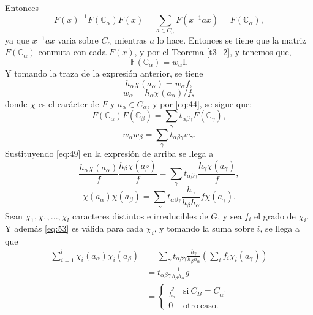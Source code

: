 \documentclass[12pt]{book}
\theoremstyle{definition}
\newcounter{in}
\begin{document}
Entonces
\begin{equation}
  \label{eq:47}
  F(x)^{-1}F(\mathbb{C}_{\alpha})F(x)=\sum_{a \in C_{\alpha}}F(x^{-1}ax)=F(\mathbb{C}_{\alpha}),
\end{equation}
ya que $x^{-1}ax$ varia sobre $C_{\alpha}$ mientras $a$ lo
hace. Entonces se tiene que la matriz $F (\mathbb{C}_{\alpha})$ conmuta con cada $F(x)$, y
por el Teorema \ref{t3_2}, y tenemos que,
\begin{equation}
  \label{eq:48}
   \mathbb{F} (\mathbb{C}_{\alpha})=w_{\alpha}\mathrm{I}.
\end{equation}
Y tomando la traza de la expresión anterior, se tiene
\begin{equation}
  \label{eq:49}
  h_{\alpha}\chi(a_{\alpha})=w_{\alpha}f,
\end{equation}
\begin{equation}
  \label{eq:50}
  w_{\alpha}=h_{\alpha}\chi(a_{\alpha})/f,
\end{equation}
donde $\chi$ es el carácter de $F$ y
$a_{\alpha} \in C_{\alpha}$, y por \ref{eq:44}, se sigue que:
\begin{equation}
  \label{eq:51}
  F (\mathbb{C}_{\alpha})  F (\mathbb{C}_{\beta}) = \sum_{\gamma} t_{\alpha \beta \gamma} F(\mathbb{C}_{\gamma}),
\end{equation}
\begin{equation}
  \label{eq:52}
  w_{\alpha}w_{\beta} = \sum_{\gamma} t_{\alpha \beta \gamma} w_{\gamma}.
\end{equation}
Sustituyendo \ref{eq:49} en la expresión de arriba se llega a
\begin{equation*}
  \frac{h_{\alpha} \chi(a_{\alpha})}{f} \frac{h_{\beta} \chi(a_{\beta})}{f} = \sum_{\gamma} t_{\alpha \beta \gamma} \frac{h_{\gamma} \chi(a_{\gamma})}{f},
\end{equation*}
\begin{equation}
  \label{eq:53}
   \chi(a_{\alpha}) \chi(a_{\beta}) = \sum_{\gamma} t_{\alpha \beta \gamma} \frac{h_{\gamma}}{h_{\beta} h_{\alpha}} f \chi(a_{\gamma}).
\end{equation}
Sean $\chi_{1}, \chi_{1},..., \chi_{l}$ caracteres distintos e
irreducibles de $G$, y sea $f_{i}$ el grado de $\chi_{i}$. Y además
\ref{eq:53} es válida para cada $\chi_{i}$, y tomando la suma sobre
$i$, se llega a que
\begin{equation}
  \label{eq:54}
  \begin{aligned}
    \sum_{i=1}^{l} \chi_{i}(a_{\alpha}) \chi_{i}(a_{\beta}) &= \sum_{\gamma} t_{\alpha \beta \gamma} \frac{h_{\gamma}}{h_{\beta} h_{\alpha}} (\sum_{i} f_{i} \chi_{i}(a_{\gamma})) \\
    &= t_{\alpha \beta \gamma} \frac{1}{h_{\beta} h_{\alpha}}g \\
    &=  \left\{
	       \begin{array}{ll}
		 \frac{g}{h_{\alpha}}      & \mathrm{si\ } C_{B} = C_{\alpha^{'}} \\
		 0      & \mathrm{otro\ caso.\ } 
	       \end{array}
	     \right.
    \end{aligned}
\end{equation}
\end{document}
